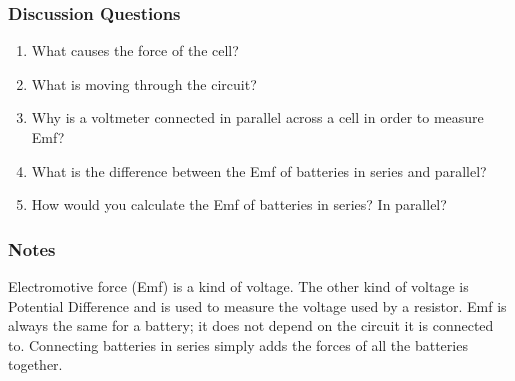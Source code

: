 \subsubsection*{Discussion Questions}
\begin{enumerate}
\item{What causes the force of the cell?}
\item{What is moving through the circuit?}
\item{Why is a voltmeter connected in parallel across a cell in order to measure Emf?}
\item{What is the difference between the Emf of batteries in series and parallel?}
\item{How would you calculate the Emf of batteries in series?  In parallel?}
\end{enumerate}

\subsubsection*{Notes}
Electromotive force (Emf) is a kind of voltage.  The other kind of voltage is Potential Difference and is used to measure the voltage used by a resistor.  Emf is always the same for a battery; it does not depend on the circuit it is connected to.  Connecting batteries in series simply adds the forces of all the batteries together.
